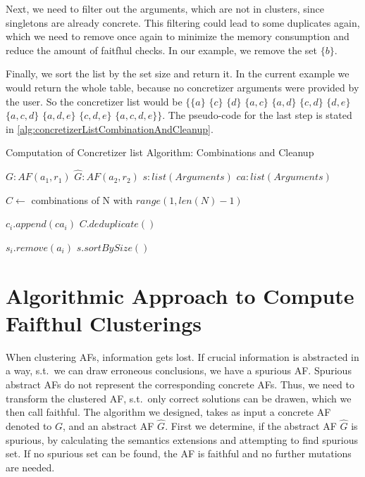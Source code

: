 Next, we need to filter out the arguments, which are not in clusters, since singletons are already concrete. This filtering could lead to some duplicates again, which we need to remove once again to minimize the memory consumption and reduce the amount of faitfhul checks. In our example, we remove the set $\{b\}$.

Finally, we sort the list by the set size and return it. In the current example we would return the whole table, because no concretizer arguments were provided by the user. So the concretizer list would be
$\bigl\{\{a\}$
$\{c\}$
$\{d\}$
$\{a, c\}$
$\{a, d\}$
$\{c, d\}$
$\{d, e\}$
$\{a, c, d\}$
$\{a, d, e\}$
$\{c, d, e\}$
$\{a, c, d, e\}\bigl\}$. The pseudo-code for the last step is stated in \cref{alg:concretizerListCombinationAndCleanup}.


\begin{algorithm}
    \caption{Computation of Concretizer list Algorithm: Combinations and Cleanup}\label{alg:concretizerListCombinationAndCleanup}
    \begin{algorithmic}[1]
        \Require $G: AF(a_1, r_1)$ 
        \Require $\hat{G}: AF(a_2, r_2)$ 
        \Require $s: list(Arguments)$ 
        \Require $ca: list(Arguments)$ 

        \State $C \gets$ combinations of N with $range(1, len(N)-1)$ 

         
                \State $c_i.append(ca_i)$
            \EndFor
        \EndFor
        \State $C.deduplicate()$

         
                    \State $s_i.remove(a_i)$
                \EndIf
            \EndFor
        \EndFor
        \State \Return $s.sortBySize()$
    \end{algorithmic}
\end{algorithm}

\newpage

\section{Algorithmic Approach to Compute Faifthul Clusterings}
\label{sec:AlgorithmicApproachToComputeFaifthulClusterings}
When clustering AFs, information gets lost. If crucial information is abstracted in a way, s.t.\ we can draw erroneous conclusions, we have a spurious AF. Spurious abstract AFs do not represent the corresponding concrete AFs. Thus, we need to transform the clustered AF, s.t.\ only correct solutions can be drawen, which we then call faithful. The algorithm we designed, takes as input a concrete AF denoted to $G$, and an abstract AF $\hat{G}$. First we determine, if the abstract AF $\hat{G}$ is spurious, by calculating the semantics extensions and attempting to find spurious set. If no spurious set can be found, the AF is faithful and no further mutations are needed.

